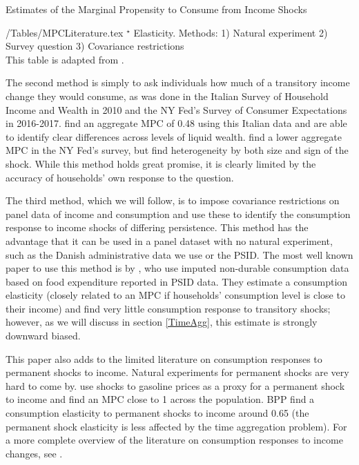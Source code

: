 \documentclass[titlepage]{\econtex}\newcommand{\texname}{ConsumptionHeterogeneity}
\begin{document}
\begin{sidewaystable} \small
	\caption{Estimates of the Marginal Propensity to Consume from Income Shocks}
	\label{table:MPCLiterature}
	\begin{minipage}{\textwidth}
		\econtexRoot/Tables/MPCLiterature.tex 
		\footnotesize{$^{\star}$ Elasticity. Methods: 1) Natural experiment 2) Survey question 3) Covariance restrictions \\
		This table is adapted from \cite{carroll_distribution_2017}.}
	\end{minipage}
\end{sidewaystable}

The second method is simply to ask individuals how much of a transitory income change they would consume, as was done in the Italian Survey of Household Income and Wealth in 2010 and the NY Fed's Survey of Consumer
Expectations in 2016-2017. \cite{jappelli_fiscal_2014} find an aggregate MPC of 0.48 using this Italian data and are able to identify clear differences across levels of liquid wealth. \cite{fuster_what_2018} find a lower aggregate MPC in the NY Fed's survey, but find heterogeneity by both size and sign of the shock. While this method holds great promise, it is clearly limited by the accuracy of households' own response to the question.

The third method, which we will follow, is to impose covariance restrictions on panel data of income and consumption and use these to identify the consumption response to income shocks of differing persistence. This method has the advantage that it can be used in a panel dataset with no natural experiment, such as the Danish administrative data we use or the PSID. The most well known paper to use this method is by \cite{blundell_consumption_2008}, who use imputed non-durable consumption data based on food expenditure reported in PSID data. They estimate a consumption elasticity (closely related to an MPC if households' consumption level is close to their income) and find very little consumption response to transitory shocks; however, as we will discuss in section \ref{TimeAgg}, this estimate is strongly downward biased.

This paper also adds to the limited literature on consumption responses to permanent shocks to income. Natural experiments for permanent shocks are very hard to come by. \cite{gelman_response_2016} use shocks to gasoline prices as a proxy for a permanent shock to income and find an MPC close to 1 across the population. BPP find a consumption elasticity to permanent shocks to income around 0.65 (the permanent shock elasticity is less affected by the time aggregation problem). For a more complete overview of the literature on consumption responses to income changes, see \cite{jappelli_consumption_2010}.
\end{document}
